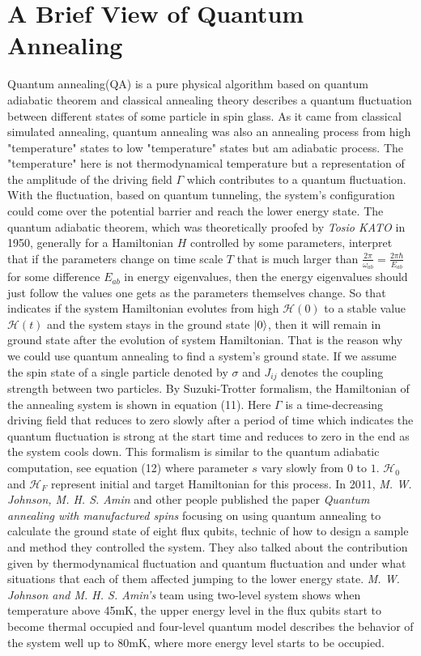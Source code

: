 \documentclass{turabian-researchpaper}
\begin{document}
\section{A Brief View of Quantum Annealing}
    Quantum annealing(QA) is a pure physical algorithm based on quantum adiabatic theorem and classical annealing theory describes a quantum fluctuation between different states of some particle in spin glass. As it came from classical simulated annealing, quantum annealing was also an annealing process from high "temperature" states to low "temperature" states but am adiabatic process. The "temperature" here is not thermodynamical temperature but a representation of the amplitude of the driving field $\Gamma$ which contributes to a quantum fluctuation. With the fluctuation, based on quantum tunneling, the system's configuration could come over the potential barrier and reach the lower energy state. The quantum adiabatic theorem, which was theoretically proofed by \textit{Tosio KATO} in 1950, generally for a Hamiltonian $H$ controlled by some parameters, interpret that if the parameters change on time scale $T$ that is much larger than $\frac{2\pi}{\omega_{ab}} = \frac{2\pi\hbar}{E_{ab}}$ for some difference $E_{ab}$ in energy eigenvalues, then the energy eigenvalues should just follow the values one gets as the parameters themselves change. So that indicates if the system Hamiltonian evolutes from high  $\mathcal{H} (0)$ to a stable value $\mathcal{H} (t)$ and the system stays in the ground state $\ket{0}$, then it will remain in ground state after the evolution of system Hamiltonian. That is the reason why we could use quantum annealing to find a system's ground state. If we assume the spin state of a single particle denoted by $\sigma$ and $J_{ij}$ denotes the coupling strength between two particles. By Suzuki-Trotter formalism, the Hamiltonian of the annealing system is shown in equation (11). Here $\Gamma$ is a time-decreasing driving field that reduces to zero slowly after a period of time which indicates the quantum fluctuation is strong at the start time and reduces to zero in the end as the system cools down. This formalism is similar to the quantum adiabatic computation, see equation (12) where parameter $s$ vary slowly from $0$ to $1$. $\mathcal{H} _0$ and $\mathcal{H} _F$ represent initial and target Hamiltonian for this process. In 2011, \textit{M. W. Johnson, M. H. S. Amin} and other people published the paper \textit{Quantum annealing with manufactured spins}\cite{johnson2011quantum} focusing on using quantum annealing to calculate the ground state of eight flux qubits, technic of how to design a sample and method they controlled the system. They also talked about the contribution given by thermodynamical fluctuation and quantum fluctuation and under what situations that each of them affected jumping to the lower energy state. \textit{M. W. Johnson and M. H. S. Amin's } team using two-level system shows when temperature above 45mK, the upper energy level in the flux qubits start to become thermal occupied and four-level quantum model describes the behavior of the system well up to 80mK, where more energy level starts to be occupied\cite{johnson2011quantum}. 
\end{document}
